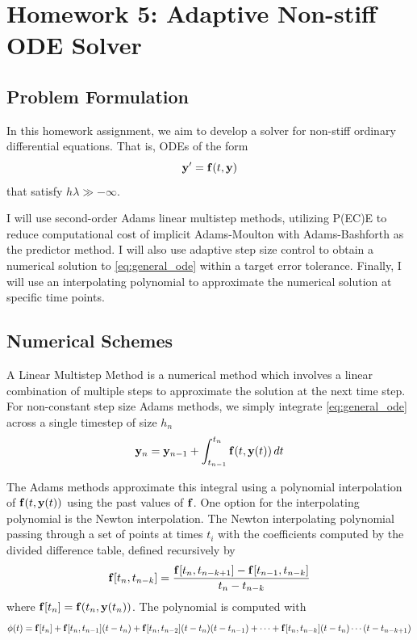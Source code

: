 \documentclass[12pt]{article}
\begin{document}
	
\section*{Homework 5: Adaptive Non-stiff ODE Solver}

\subsection*{Problem Formulation}

In this homework assignment, we aim to develop a solver for non-stiff ordinary differential equations. That is, ODEs of the form
\begin{equation}
	\vb{y}'=\vb{f}(t,\vb{y})
	\label{eq:general_ode}
\end{equation}
that satisfy $h\lambda\gg -\infty$.

I will use second-order Adams linear multistep methods, utilizing P(EC)E to reduce computational cost of implicit Adams-Moulton with Adams-Bashforth as the predictor method.
I will also use adaptive step size control to obtain a numerical solution to \eqref{eq:general_ode} within a target error tolerance.
Finally, I will use an interpolating polynomial to approximate the numerical solution at specific time points.

\subsection*{Numerical Schemes}

A Linear Multistep Method is a numerical method which involves a linear combination of multiple steps to approximate the solution at the next time step.
For non-constant step size Adams methods, we simply integrate \eqref{eq:general_ode} across a single timestep of size $h_n$
\begin{equation*}
	\vb{y}_n=\vb{y}_{n-1}+\int_{t_{n-1}}^{t_n}\vb{f}(t,\vb{y}(t))\,dt
\end{equation*}

The Adams methods approximate this integral using a polynomial interpolation of $\vb{f}(t,\vb{y}(t))$ using the past values of $\vb{f}$.
One option for the interpolating polynomial is the Newton interpolation.
The Newton interpolating polynomial passing through a set of points at times $t_i$ with the coefficients computed by the divided difference table, defined recursively by
\begin{equation}
	\vb{f}[t_n,t_{n-k}]=\frac{\vb{f}[t_n,t_{n-k+1}]-\vb{f}[t_{n-1},t_{n-k}]}{t_{n}-t_{n-k}}
	\label{eq:DD_table}
\end{equation}
where $\vb{f}[t_n]=\vb{f}(t_n,\vb{y}(t_n))$.
The polynomial is computed with
\begin{equation}
	\phi(t)=\vb{f}[t_n]+\vb{f}[t_n,t_{n-1}](t-t_n)+\vb{f}[t_n,t_{n-2}](t-t_n)(t-t_{n-1})+\cdots+\vb{f}[t_n,t_{n-k}](t-t_n)\cdots(t-t_{n-k+1})
	\label{eq:newton_poly}
\end{equation}
\end{document}
